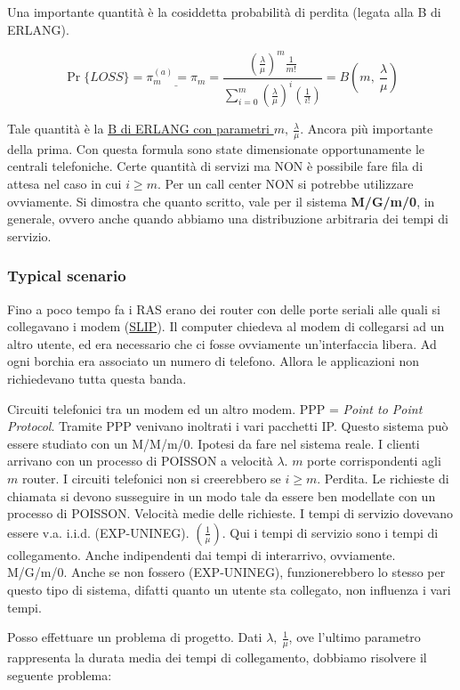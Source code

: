 Una importante quantità è la cosiddetta probabilità di perdita (legata alla B di ERLANG).

\[
	\Pr\{LOSS\} = \underline{\pi_m^{(a)} = \pi_m} = \frac{{(\frac{\lambda}{\mu})^m \frac{1}{m!}}}{\sum_{i=0}^m{(\frac{\lambda}{\mu})^i (\frac{1}{i!})}} = B(m,\ \frac{\lambda}{\mu})
\]

Tale quantità è la \underline{B di ERLANG con parametri $m,\ \frac{\lambda}{\mu}$}. Ancora più importante della prima. Con questa formula sono state dimensionate opportunamente le centrali telefoniche. Certe quantità di servizi ma NON è possibile fare fila di attesa nel caso in cui $i\geq m$. Per un call center NON si potrebbe utilizzare ovviamente. Si dimostra che quanto scritto, vale per il sistema \textbf{M/G/m/0}, in generale, ovvero anche quando abbiamo una distribuzione arbitraria dei tempi di servizio.

\subsubsection{Typical scenario}

Fino a poco tempo fa i RAS erano dei router con delle porte seriali alle quali si collegavano i modem (\underline{SLIP}). Il computer chiedeva al modem di collegarsi ad un altro utente, ed era necessario che ci fosse ovviamente un'interfaccia libera. Ad ogni borchia era associato un numero di telefono. Allora le applicazioni non richiedevano tutta questa banda.

Circuiti telefonici tra un modem ed un altro modem. PPP = \textit{Point to Point Protocol}. Tramite PPP venivano inoltrati i vari pacchetti IP. Questo sistema può essere studiato con un M/M/m/0. Ipotesi da fare nel sistema reale. I clienti arrivano con un processo di POISSON a velocità $\lambda$. $m$ porte corrispondenti agli $m$ router. I circuiti telefonici non si creerebbero se $i\geq m$. Perdita. Le richieste di chiamata si devono susseguire in un modo tale da essere ben modellate con un processo di POISSON. Velocità medie delle richieste. I tempi di servizio dovevano essere v.a. i.i.d. (EXP-UNINEG). $(\frac{1}{\mu})$. Qui i tempi di servizio sono i tempi di collegamento. Anche indipendenti dai tempi di interarrivo, ovviamente. M/G/m/0. Anche se non fossero (EXP-UNINEG), funzionerebbero lo stesso per questo tipo di sistema, difatti quanto un utente sta collegato, non influenza i vari tempi. 

Posso effettuare un problema di progetto. Dati $\lambda,\ \frac{1}{\mu}$, ove l'ultimo parametro rappresenta la durata media dei tempi di collegamento, dobbiamo risolvere il seguente problema:

